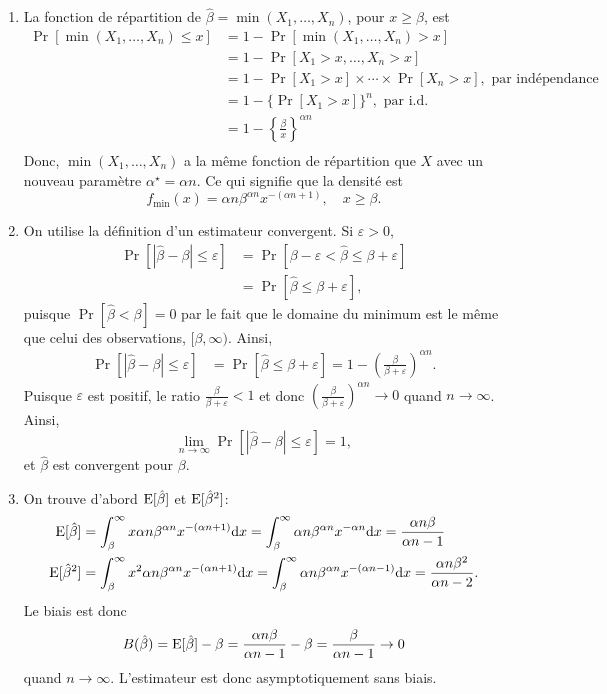 \begin{solution}{3.10}
\begin{enumerate}
\item La fonction de répartition de $\hat \beta=\min(X_1,\ldots,X_n)$, pour $x\geq \beta$, est
\begin{align*}
\Pr[\min(X_1,\ldots,X_n)\leq x] & = 1- \Pr[\min(X_1,\ldots,X_n)> x]\\
&= 1-\Pr[X_1>x,\ldots,X_n>x]\\
&=1-\Pr[X_1>x]\times\cdots\times\Pr[X_n>x],\mbox{ par indépendance}\\
&=1-\{\Pr[X_1>x]\}^n,\mbox{ par i.d.}\\
&=1-\left\{\frac{\beta}{x}\right\}^{\alpha n}\\
\end{align*}
Donc, $\min(X_1,\ldots,X_n)$ a la même fonction de répartition que $X$ avec un nouveau paramètre $\alpha^\star=\alpha n$. Ce qui signifie que la densité est
$$
f_{\min}(x)=\alpha n \beta^{\alpha n}x^{-(\alpha n+1)},\quad x\geq \beta.
$$

\item On utilise la définition d'un estimateur convergent. Si $\varepsilon>0$,
\begin{align*}
\Pr[|\hat\beta-\beta|\leq \varepsilon]&=\Pr[\beta-\varepsilon<\hat\beta\leq \beta+\varepsilon] \\
&=\Pr[\hat\beta\leq \beta+\varepsilon],
\end{align*}
puisque $\Pr[\hat\beta<\beta]=0$ par le fait que le domaine du minimum est le même que celui des observations, $[\beta,\infty)$. Ainsi,
\begin{align*}
\Pr[|\hat\beta-\beta|\leq \varepsilon]&=\Pr[\hat\beta\leq \beta+\varepsilon]=1-\left(\frac{\beta}{\beta+\varepsilon}\right)^{\alpha n}.
\end{align*}
Puisque $\varepsilon$ est positif, le ratio $\frac{\beta}{\beta+\varepsilon}<1$ et donc $\left(\frac{\beta}{\beta+\varepsilon}\right)^{\alpha n}\to 0$ quand $n\to\infty$. Ainsi,
$$
\lim_{n\to\infty} \Pr[|\hat\beta-\beta|\leq \varepsilon]=1,
$$
et $\hat\beta$ est convergent pour $\beta$.

\item On trouve d'abord $\operatorname{E}[\hat\beta]$ et $\operatorname{E}[\hat\beta^2]$:
\begin{align*}
\operatorname{E}[\hat\beta]&=\int_\beta^\infty x \alpha n \beta^{\alpha n}x^{-(\alpha n+1)}\mbox{d} x = \int_\beta^\infty  \alpha n \beta^{\alpha n}x^{-\alpha n}\mbox{d} x = \frac{\alpha n\beta}{\alpha n-1}\\
\operatorname{E}[\hat\beta^2]&=\int_\beta^\infty x^2 \alpha n \beta^{\alpha n}x^{-(\alpha n+1)}\mbox{d} x = \int_\beta^\infty  \alpha n \beta^{\alpha n}x^{-(\alpha n-1)}\mbox{d} x = \frac{\alpha n\beta^2}{\alpha n-2}.
\end{align*}
Le biais est donc
$$
B(\hat\beta)=\operatorname{E}[\hat\beta]-\beta = \frac{\alpha n\beta}{\alpha n-1}-\beta = \frac{\beta}{\alpha n -1}\to 0
$$
quand $n\to \infty$. L'estimateur est donc asymptotiquement sans biais.


\end{enumerate}
\end{solution}
